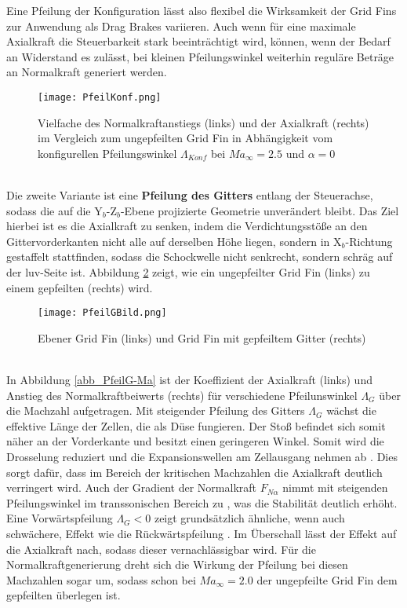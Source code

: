 Eine Pfeilung der Konfiguration lässt also flexibel die Wirksamkeit der Grid Fins zur Anwendung als Drag Brakes variieren. Auch wenn für eine maximale Axialkraft die Steuerbarkeit stark beeinträchtigt wird, können, wenn der Bedarf an Widerstand es zulässt, bei kleinen Pfeilungswinkel weiterhin reguläre Beträge an Normalkraft generiert werden.
\begin{figure}[h]
	\centering
	\texttt{[image: PfeilKonf.png]}
	\begin{flushright}
	\end{flushright}
	\caption{Vielfache des Normalkraftanstiegs (links) und der Axialkraft (rechts) im Vergleich zum ungepfeilten Grid Fin in Abhängigkeit vom konfigurellen Pfeilungswinkel $\Lambda_{Konf}$ bei $Ma_\infty = 2.5$ und $\alpha = 0$}
	\label{abb_lastvielfache}
\end{figure}\\
Die zweite Variante ist eine \textbf{Pfeilung des Gitters} entlang der Steuerachse, sodass die auf die Y$_b$-Z$_b$-Ebene projizierte Geometrie unverändert bleibt. Das Ziel hierbei ist es die Axialkraft zu senken, indem die Verdichtungsstöße an den Gittervorderkanten nicht alle auf derselben Höhe liegen, sondern in X$_b$-Richtung gestaffelt stattfinden, sodass die Schockwelle nicht senkrecht, sondern schräg auf der luv-Seite ist. Abbildung \ref{abb_PfeilG} zeigt, wie ein ungepfeilter Grid Fin (links) zu einem gepfeilten (rechts) wird.
\begin{figure}[h]
	\centering
	\texttt{[image: PfeilGBild.png]}
	\begin{flushright}
			\flushbottom{Quelle: \cite{PfeilG3}}
	\end{flushright}
	\caption{Ebener Grid Fin (links) und Grid Fin mit gepfeiltem Gitter (rechts)}
	\label{abb_PfeilG}
\end{figure}\\
In Abbildung \ref{abb_PfeilG-Ma} ist der Koeffizient der Axialkraft (links) und Anstieg des Normalkraftbeiwerts (rechts) für verschiedene Pfeilunswinkel $\Lambda_{G}$ über die Machzahl aufgetragen. Mit steigender Pfeilung des Gitters $\Lambda_G$ wächst die effektive Länge der Zellen, die als Düse fungieren. Der Stoß befindet sich somit näher an der Vorderkante und besitzt einen geringeren Winkel. Somit wird die Drosselung reduziert und die Expansionswellen am Zellausgang nehmen ab \cite{PfeilG1}. Dies sorgt dafür, dass im Bereich der kritischen Machzahlen die Axialkraft deutlich verringert wird. Auch der Gradient der Normalkraft $F_{N\alpha}$ nimmt mit steigenden Pfeilungswinkel im transsonischen Bereich zu \cite{PfeilG1}, was die Stabilität deutlich erhöht. Eine Vorwärtspfeilung $\Lambda_{G} < 0$ zeigt grundsätzlich ähnliche, wenn auch schwächere, Effekt wie die Rückwärtspfeilung \cite{PfeilG2}. Im Überschall lässt der Effekt auf die Axialkraft nach, sodass dieser vernachlässigbar wird. Für die Normalkraftgenerierung dreht sich die Wirkung der Pfeilung bei diesen Machzahlen sogar um, sodass schon bei $Ma_\infty=2.0$ der ungepfeilte Grid Fin dem gepfeilten überlegen ist.

